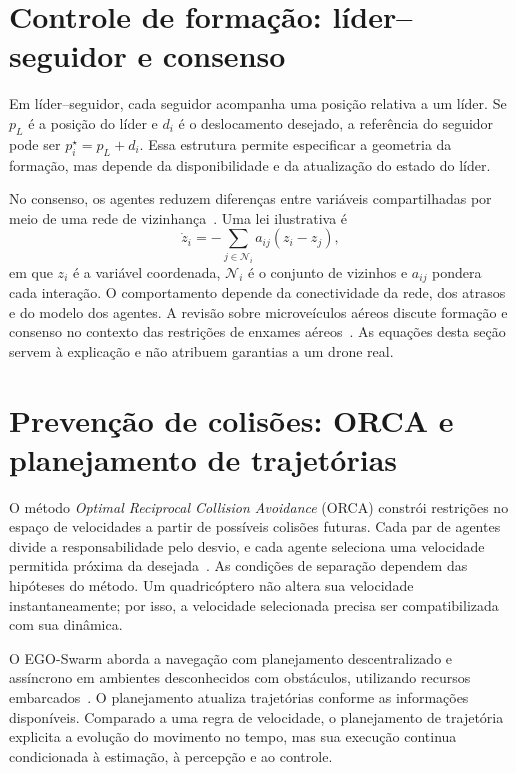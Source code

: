 \documentclass[11pt,a4paper,oneside]{book}
\numberwithin{equation}{chapter}
\begin{document}
\section{Controle de formação: líder--seguidor e consenso}
Em líder--seguidor, cada seguidor acompanha uma posição relativa a um líder. Se $p_L$ é a posição do líder e $d_i$ é o deslocamento desejado, a referência do seguidor pode ser $p_i^\star=p_L+d_i$. Essa estrutura permite especificar a geometria da formação, mas depende da disponibilidade e da atualização do estado do líder.

No consenso, os agentes reduzem diferenças entre variáveis compartilhadas por meio de uma rede de vizinhança~\cite{consenso}. Uma lei ilustrativa é
\begin{equation}
 \dot z_i=-\sum_{j\in\mathcal N_i}a_{ij}(z_i-z_j),
\end{equation}
em que $z_i$ é a variável coordenada, $\mathcal N_i$ é o conjunto de vizinhos e $a_{ij}$ pondera cada interação. O comportamento depende da conectividade da rede, dos atrasos e do modelo dos agentes. A revisão sobre microveículos aéreos discute formação e consenso no contexto das restrições de enxames aéreos~\cite{survey}. As equações desta seção servem à explicação e não atribuem garantias a um drone real.

\section{Prevenção de colisões: ORCA e planejamento de trajetórias}
O método \emph{Optimal Reciprocal Collision Avoidance} (ORCA) constrói restrições no espaço de velocidades a partir de possíveis colisões futuras. Cada par de agentes divide a responsabilidade pelo desvio, e cada agente seleciona uma velocidade permitida próxima da desejada~\cite{orca}. As condições de separação dependem das hipóteses do método. Um quadricóptero não altera sua velocidade instantaneamente; por isso, a velocidade selecionada precisa ser compatibilizada com sua dinâmica.

O EGO-Swarm aborda a navegação com planejamento descentralizado e assíncrono em ambientes desconhecidos com obstáculos, utilizando recursos embarcados~\cite{ego}. O planejamento atualiza trajetórias conforme as informações disponíveis. Comparado a uma regra de velocidade, o planejamento de trajetória explicita a evolução do movimento no tempo, mas sua execução continua condicionada à estimação, à percepção e ao controle.
\end{document}
